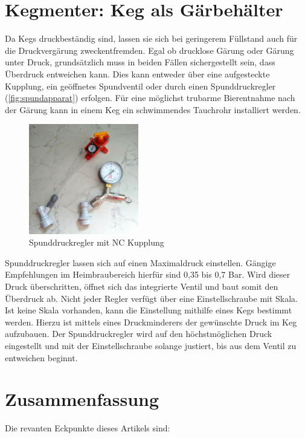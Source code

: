 \documentclass[a4paper,parskip=half]{scrartcl}
\begin{document}
\section*{Kegmenter: Keg als Gärbehälter}

Da Kegs druckbeständig sind, lassen sie sich bei geringerem Füllstand auch für die Druckvergärung zweckentfremden. Egal ob drucklose Gärung oder Gärung unter Druck, grundsätzlich muss in beiden Fällen sichergestellt sein, dass Überdruck entweichen kann. Dies kann entweder über eine aufgesteckte Kupplung, ein geöffnetes Spundventil oder durch einen Spunddruckregler (\autoref{fig:spundapparat}) erfolgen. Für eine möglichst trubarme Bierentnahme nach der Gärung kann in einem Keg ein schwimmendes Tauchrohr installiert werden. \autocite{Felmann2020}

\begin{figure}[h]
\centering
\includegraphics[width=4.8cm]{images/spundapparat.jpg}
\caption{Spunddruckregler mit NC Kupplung}
\label{fig:spundapparat}
\end{figure}

Spunddruckregler lassen sich auf einen Maximaldruck einstellen. Gängige Empfehlungen im Heimbraubereich hierfür sind 0,35 bis 0,7 Bar. Wird dieser Druck überschritten, öffnet sich das integrierte Ventil und baut somit den Überdruck ab. Nicht jeder Regler verfügt über eine Einstellschraube mit Skala. Ist keine Skala vorhanden, kann die Einstellung mithilfe eines Kegs bestimmt werden. Hierzu ist mittels eines Druckminderers der gewünschte Druck im Keg aufzubauen. Der Spunddruckregler wird auf den höchstmöglichen Druck eingestellt und mit der Einstellschraube solange justiert, bis  aus dem Ventil zu entweichen beginnt.

\section*{Zusammenfassung}

Die revanten Eckpunkte dieses Artikels sind:
\end{document}

